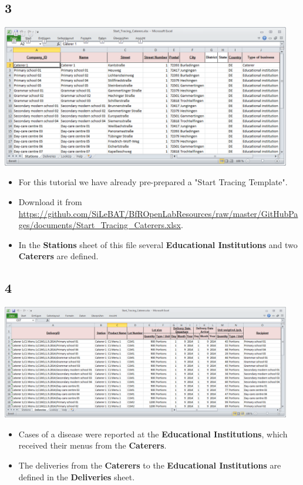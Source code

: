 \documentclass{beamer}
\begin{document}
\subsection{3}
\begin{frame}
	\begin{center}
  		\includegraphics[width=0.95\textwidth]{3.png}
	\end{center}
	\begin{itemize}
		\item For this tutorial we have already pre-prepared a "Start Tracing Template".
		\item Download it from \url{https://github.com/SiLeBAT/BfROpenLabResources/raw/master/GitHubPages/documents/Start_Tracing_Caterers.xlsx}.
		\item In the \textbf{Stations} sheet of this file several \textbf{Educational Institutions} and two \textbf{Caterers} are defined.
	\end{itemize}
\end{frame}

\subsection{4}
\begin{frame}
	\begin{center}
  		\includegraphics[width=0.95\textwidth]{4.png}
	\end{center}
	\begin{itemize}
		\item Cases of a disease were reported at the \textbf{Educational Institutions}, which received their menus from the \textbf{Caterers}.
		\item The deliveries from the \textbf{Caterers} to the \textbf{Educational Institutions} are defined in the \textbf{Deliveries} sheet.
	\end{itemize}
\end{frame}
\end{document}
